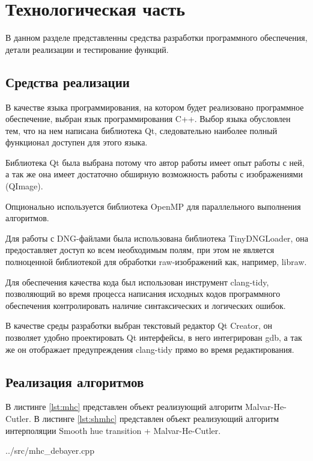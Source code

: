 \chapter{Технологическая часть}

В данном разделе представленны средства разработки программного обеспечения, детали реализации и тестирование функций.

\section{Средства реализации}

В качестве языка программирования, на котором будет реализовано программное обеспечение, выбран язык программирования C++. \cite{cpp} Выбор языка обусловлен тем, что на нем написана библиотека Qt, следовательно наиболее полный функционал доступен для этого языка. 

Библиотека Qt была выбрана потому что автор работы имеет опыт работы с ней, а так же она имеет достаточно обширную возможность работы с изображениями (QImage). \cite{qt}

Опционально используется библиотека OpenMP для параллельного выполнения алгоритмов. \cite{openmp}

Для работы с DNG-файлами была использована библиотека TinyDNGLoader, она предоставляет доступ ко всем необходимым полям, при этом не является полноценной библиотекой для обработки raw-изображений как, например, libraw. \cite{tinydng}

Для обеспечения качества кода был использован инструмент clang-tidy, позволяющий во время процесса написания исходных кодов программного обеспечения контролировать наличие синтаксических и логических ошибок. \cite{clang-tidy}

В качестве среды разработки выбран текстовый редактор Qt Creator, \cite{qtc} он позволяет удобно проектировать Qt интерфейсы, в него интегрирован gdb, \cite{gdb} а так же он отображает предупреждения clang-tidy прямо во время редактирования.

\section{Реализация алгоритмов}

В листинге \ref{lst:mhc} представлен объект реализующий алгоритм Malvar-He-Cutler. В листинге \ref{lst:shmhc} представлен объект реализующий алгоритм интерполяции Smooth hue transition + Malvar-He-Cutler.

\begin{lstinputlisting}[
	caption={Malvar-He-Cutler.},
	label={lst:mhc},
	style={cpp},
	]{../src/mhc_debayer.cpp}
\end{lstinputlisting}

